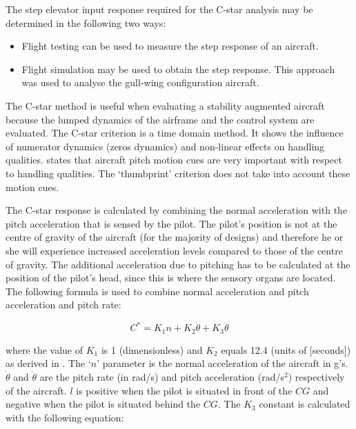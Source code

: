 \documentclass{report}
\begin{document}
The step elevator input response required for the C-star analysis may be determined in the following two ways:

\begin{itemize}
	\item{Flight testing can be used to measure the step response of an aircraft.}
	\item{Flight simulation may be used to obtain the step response.  This approach was used to analyse the gull-wing configuration aircraft.} 
\end{itemize}

The C-star method is useful when evaluating a stability augmented aircraft because the lumped dynamics of the airframe and the control system are evaluated.  The C-star criterion is a time domain method.  It shows the influence of numerator dynamics (zeros dynamics) and non-linear effects on handling qualities.   states that aircraft pitch motion cues are very important with respect to handling qualities.  The `thumbprint' criterion does not take into account these motion cues.  

The C-star response is calculated by combining the normal acceleration with the pitch acceleration that is sensed by the pilot.  The pilot's position is not at the centre of gravity of the aircraft (for the majority of designs) and therefore he or she will experience increased acceleration levels compared to those of the centre of gravity. The additional acceleration due to pitching has to be calculated at the position of the pilot's head, since this is where the sensory organs are located.  The following formula is used to combine normal acceleration and pitch acceleration and pitch rate:

\begin{equation}\label{Eq: Cstar}
	C^* = K_1 n + K_2 \dot{\theta} + K_3 \ddot{\theta}
\end{equation}


where the value of $K_1$ is 1 (dimensionless) and $K_2$ equals 12.4 (units of [seconds]) as derived in .  The `$n$' parameter is the normal acceleration of the aircraft in g's.  $\dot{\theta}$ and $\ddot{\theta}$ are the pitch rate (in rad/s) and pitch acceleration (rad/s$^2$) respectively of the aircraft.  $l$ is positive when the pilot is situated in front of the $CG$ and negative when the pilot is situated behind the $CG$.  The $K_3$ constant is calculated with the following equation:
\end{document}
